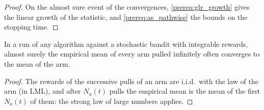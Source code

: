 \begin{proof}
  \leanok
  On the almost sure event of the convergences, \cref{prereq:glr_growth} gives the linear growth
  of the statistic, and \cref{prereq:as_pathwise} the bounds on the stopping time.
\end{proof}

\begin{lemma}
  \label{prereq:slln}
  \leanok
  In a run of any algorithm against a stochastic bandit with integrable rewards, almost surely the
  empirical mean of every arm pulled infinitely often converges to the mean of the arm.
\end{lemma}

\begin{proof}
  \leanok
  The rewards of the successive pulls of an arm are i.i.d.\ with the law of the arm (in LML), and
  after $N_a(t)$ pulls the empirical mean is the mean of the first $N_a(t)$ of them: the strong law
  of large numbers applies.
\end{proof}
